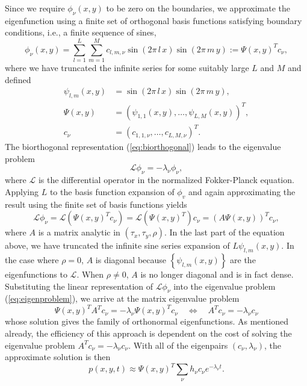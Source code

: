 \documentclass[10pt]{article}
\begin{document}
Since we require $\phi_\nu(x,y)$ to be zero on the boundaries, we
approximate the eigenfunction using a finite set of orthogonal basis
functions satisfying boundary conditions, i.e., a finite sequence of
sines,
\[
  \phi_\nu(x,y) = \sum_{l=1}^L \sum_{m=1}^M c_{l,m, \nu}
  \sin\left(2\pi\, l\, x \right) \sin\left(2\pi\, m\, y \right) := \Psi(x,y)^T c_\nu,
\]
where we have truncated the infinite series for some suitably large
$L$ and $M$ and defined
\begin{align*}
  \psi_{l,m}(x,y) &= \sin\left(2\pi\, l\, x \right)
                         \sin\left(2\pi\, m\, y \right), \\
  \Psi(x,y) &= (\psi_{1,1}(x,y), \ldots, \psi_{L,M}(x,y))^T, \\
  c_\nu &= (c_{1,1,\nu}, \ldots, c_{L,M,\nu})^T.
\end{align*}
The biorthogonal representation (\ref{eq:biorthogonal}) leads to the
eigenvalue problem
\begin{equation}
  \mathcal{L} \phi_\nu = -\lambda_\nu \phi_\nu, \label{eq:eigenproblem}
\end{equation}
where $\mathcal{L}$ is the differential operator in the normalized
Fokker-Planck equation. Applying $L$ to the basis function expansion
of $\phi_v $ and again approximating the result using the finite set
of basis functions yields
\[
  \mathcal{L}\phi_\nu = \mathcal{L}(\Psi(x,y)^T c_\nu) =
  \mathcal{L}(\Psi(x,y)^T) c_\nu = (A \Psi(x,y))^T c_\nu,
\] 
where $A$ is a matrix analytic in $(\tau_x, \tau_y, \rho)$. In the
last part of the equation above, we have truncated the infinite sine
series expansion of $L \psi_{l, m}(x, y)$. In the case where
$\rho = 0$, $A$ is diagonal because $\left\{ \psi_{l,m}(x,y) \right\}$
are the eigenfunctions to $\mathcal{L}$. When $\rho \neq 0$, $A$ is no
longer diagonal and is in fact dense. %
Substituting the linear representation
of $\mathcal{L}\phi_\nu$ into the eigenvalue problem
(\ref{eq:eigenproblem}), we arrive at the matrix eigenvalue problem
\[
  \Psi(x,y)^T A^T c_\nu = -\lambda_\nu \Psi(x,y)^T c_\nu
  \quad \Leftrightarrow \quad A^T c_\nu = -\lambda_\nu c_\nu
\]
whose solution gives the family of orthonormal eigenfunctions. As
mentioned already, the efficiency of this approach is dependent on the
cost of solving the eigenvalue problem
$A^T c_\nu = -\lambda_\nu c_\nu$.  With all of the eigenpairs
$(c_\nu, \lambda_\nu)$, the approximate solution is then
\[
  p(x,y,t) \approx \Psi(x,y)^T \sum_{\nu} h_\nu c_\nu e^{-\lambda_\nu t}.
\]
\end{document}
